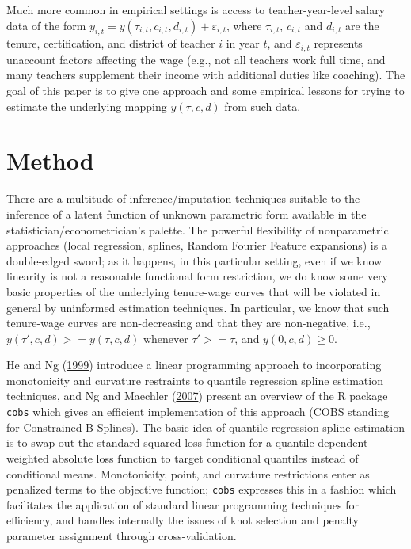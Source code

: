 \documentclass[]{article}
\begin{document}
Much more common in empirical settings is access to teacher-year-level
salary data of the form
\(y_{i, t} = y(\tau_{i, t}, c_{i, t}, d_{i, t}) + \varepsilon_{i, t}\),
where \(\tau_{i,t}\), \(c_{i, t}\) and \(d_{i, t}\) are the tenure,
certification, and district of teacher \(i\) in year \(t\), and
\(\varepsilon_{i, t}\) represents unaccount factors affecting the wage
(e.g., not all teachers work full time, and many teachers supplement
their income with additional duties like coaching). The goal of this
paper is to give one approach and some empirical lessons for trying to
estimate the underlying mapping \(y(\tau, c, d)\) from such data.

\section{Method}\label{method}

There are a multitude of inference/imputation techniques suitable to the
inference of a latent function of unknown parametric form available in
the statistician/econometrician's palette. The powerful flexibility of
nonparametric approaches (local regression, splines, Random Fourier
Feature expansions) is a double-edged sword; as it happens, in this
particular setting, even if we know linearity is not a reasonable
functional form restriction, we do know some very basic properties of
the underlying tenure-wage curves that will be violated in general by
uninformed estimation techniques. In particular, we know that such
tenure-wage curves are non-decreasing and that they are non-negative,
i.e., \(y(\tau', c, d) >= y(\tau, c, d)\) whenever \(\tau' >= \tau\),
and \(y(0, c, d) \geq 0\).

He and Ng (\protect\hyperlink{ref-he}{1999}) introduce a linear
programming approach to incorporating monotonicity and curvature
restraints to quantile regression spline estimation techniques, and Ng
and Maechler (\protect\hyperlink{ref-ng}{2007}) present an overview of
the R package \texttt{cobs} which gives an efficient implementation of
this approach (COBS standing for Constrained B-Splines). The basic idea
of quantile regression spline estimation is to swap out the standard
squared loss function for a quantile-dependent weighted absolute loss
function to target conditional quantiles instead of conditional means.
Monotonicity, point, and curvature restrictions enter as penalized terms
to the objective function; \texttt{cobs} expresses this in a fashion
which facilitates the application of standard linear programming
techniques for efficiency, and handles internally the issues of knot
selection and penalty parameter assignment through cross-validation.
\end{document}
